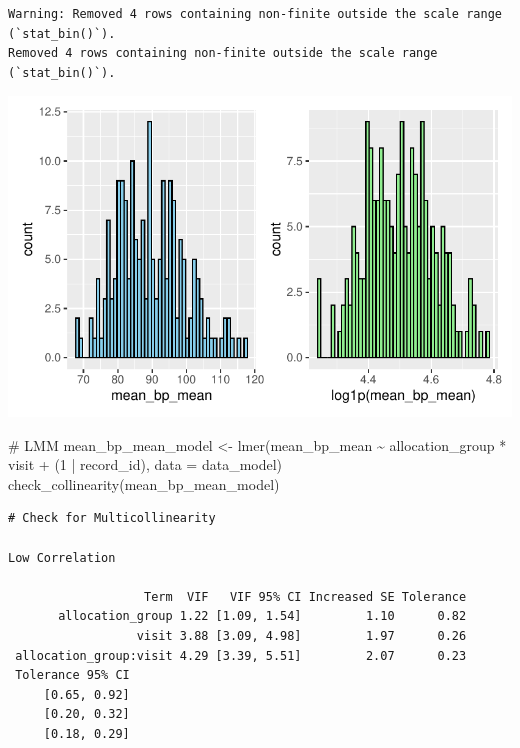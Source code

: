 \documentclass[
  letterpaper,
  DIV=11,
  numbers=noendperiod]{scrartcl}
\newenvironment{Shaded}{\begin{snugshade}}{\end{snugshade}}
\newcommand{\AttributeTok}[1]{\textcolor[rgb]{0.40,0.45,0.13}{#1}}
\newcommand{\CommentTok}[1]{\textcolor[rgb]{0.37,0.37,0.37}{#1}}
\newcommand{\DecValTok}[1]{\textcolor[rgb]{0.68,0.00,0.00}{#1}}
\newcommand{\FunctionTok}[1]{\textcolor[rgb]{0.28,0.35,0.67}{#1}}
\newcommand{\NormalTok}[1]{\textcolor[rgb]{0.00,0.23,0.31}{#1}}
\newcommand{\OtherTok}[1]{\textcolor[rgb]{0.00,0.23,0.31}{#1}}
\newcommand{\SpecialCharTok}[1]{\textcolor[rgb]{0.37,0.37,0.37}{#1}}
\begin{document}
\begin{verbatim}
Warning: Removed 4 rows containing non-finite outside the scale range (`stat_bin()`).
Removed 4 rows containing non-finite outside the scale range (`stat_bin()`).
\end{verbatim}

\includegraphics{Outcomes_V1V2V3_files/figure-pdf/mean_bp_mean_1-1.pdf}

\begin{Shaded}
\begin{Highlighting}[]
\CommentTok{\# LMM}
\NormalTok{mean\_bp\_mean\_model }\OtherTok{\textless{}{-}} \FunctionTok{lmer}\NormalTok{(mean\_bp\_mean }\SpecialCharTok{\textasciitilde{}}\NormalTok{ allocation\_group }\SpecialCharTok{*}\NormalTok{ visit }\SpecialCharTok{+}\NormalTok{ (}\DecValTok{1} \SpecialCharTok{|}\NormalTok{ record\_id), }\AttributeTok{data =}\NormalTok{ data\_model)}
\FunctionTok{check\_collinearity}\NormalTok{(mean\_bp\_mean\_model)}
\end{Highlighting}
\end{Shaded}

\begin{verbatim}
# Check for Multicollinearity

Low Correlation

                   Term  VIF   VIF 95% CI Increased SE Tolerance
       allocation_group 1.22 [1.09, 1.54]         1.10      0.82
                  visit 3.88 [3.09, 4.98]         1.97      0.26
 allocation_group:visit 4.29 [3.39, 5.51]         2.07      0.23
 Tolerance 95% CI
     [0.65, 0.92]
     [0.20, 0.32]
     [0.18, 0.29]
\end{verbatim}
\end{document}
